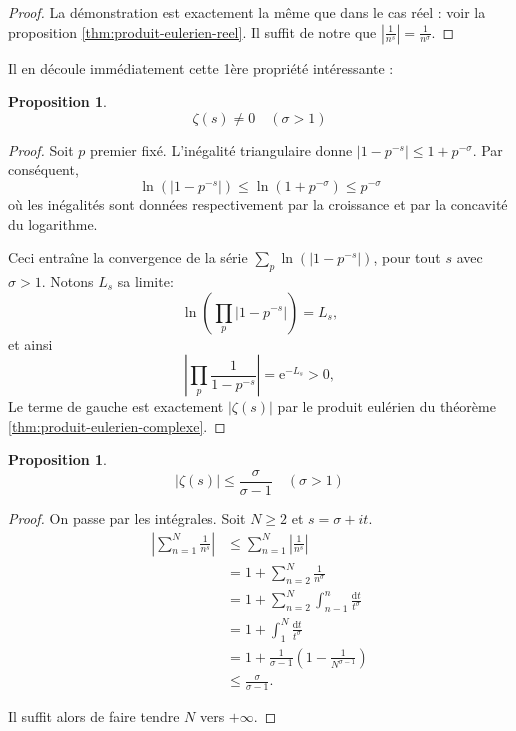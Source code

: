 \documentclass[french]{report}
\newtheorem{proposition}[theorem]{Proposition}
\begin{document}
\begin{proof}
  La démonstration est exactement la même que dans le cas réel : voir la proposition \ref{thm:produit-eulerien-reel}. Il suffit de notre que $|\frac{1}{n^s}|=\frac{1}{n^\sigma}$.
\end{proof}

Il en découle immédiatement cette 1ère propriété intéressante :

\begin{proposition}\label{eq:zeta-non-nul-produit-eulerien}
  \[ \zeta(s) \neq 0 \quad(\sigma > 1)\]
\end{proposition}

\begin{proof}
  Soit $p$ premier fixé. L'inégalité triangulaire donne $|1-p^{-s}|\leq1+p^{-\sigma}$. Par conséquent,
  \[\ln(|1-p^{-s}|)\leq\ln(1+p^{-\sigma})\leq p^{-\sigma} \]
  où les inégalités sont données respectivement par la croissance et par la concavité du logarithme.

  Ceci entraîne la convergence de la série $\sum_p\ln(|1-p^{-s}|)$, pour tout $s$ avec $\sigma>1$. Notons $L_s$ sa limite:
  \[ \ln\left(\prod_p|1-p^{-s}|\right) = L_s, \]
  et ainsi
  \[ \left|\prod_p\frac{1}{1-p^{-s}}\right| = \mathrm{e}^{-L_s} > 0, \]
  Le terme de gauche est exactement $|\zeta(s)|$ par le produit eulérien du théorème \ref{thm:produit-eulerien-complexe}.

\end{proof}

\begin{proposition}\label{prop:zeta-majoration-facile}
  \[ |\zeta(s)|\leq\frac{\sigma}{\sigma-1}\quad(\sigma>1) \]
\end{proposition}

\begin{proof}
  On passe par les intégrales. Soit $N\geq2$ et $s=\sigma+it$.
  \begin{align*}
    \left|\sum_{n=1}^N\frac{1}{n^s}\right|
    &\leq \sum_{n=1}^N\left|\frac{1}{n^s}\right| \\
    &= 1 + \sum_{n=2}^N\frac{1}{n^\sigma} \\
    &= 1 + \sum_{n=2}^N\int_{n-1}^n\frac{\mathrm{d}t}{t^\sigma} \\
    &= 1 + \int_{1}^N\frac{\mathrm{d}t}{t^\sigma} \\
    &= 1 + \frac{1}{\sigma-1}\left(1-\frac{1}{N^{\sigma-1}}\right) \\
    &\leq \frac{\sigma}{\sigma-1}.
  \end{align*}

  Il suffit alors de faire tendre $N$ vers $+\infty$.
\end{proof}
\end{document}
